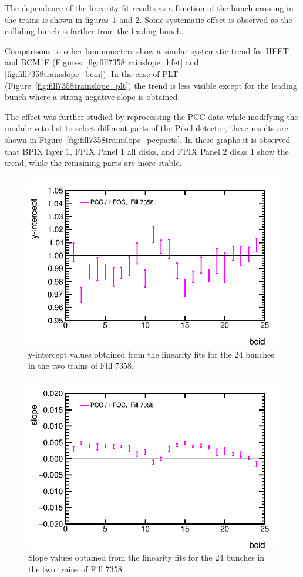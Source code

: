 The dependence of the linearity fit results as a function of  the bunch crossing in the trains is shown in figures~\ref{fig:fill7358trainintercept} and \ref{fig:fill7358trainslope}.
Some systematic effect is observed as the colliding bunch is farther from the leading bunch.

Comparisons to other luminometers show a similar systematic trend for HFET and BCM1F (Figures~\ref{fig:fill7358trainslope_hfet} and \ref{fig:fill7358trainslope_bcm}).
In the case of PLT (Figure~\ref{fig:fill7358trainslope_plt}) the trend is less visible except for the leading bunch where a strong negative slope is obtained.

The effect was further studied by reprocessing the PCC data while modifying the module veto list to select different parts of the Pixel detector, these results are shown in Figure~\ref{fig:fill7358trainslope_pccparts}.
In these graphs it is observed that BPIX layer 1, FPIX Panel 1 all disks, and FPIX Panel 2 disks 1 show the trend, while the remaining parts are more stable.

\clearpage
\begin{figure}[t]
  \begin{center}
    \includegraphics[width=0.47\linewidth]{plots/sbilratios_trains_Fill7358/plot_det_linearity_perbx_y0_7358.png}
    \caption{
      y-intercept values obtained from the linearity fits for the 24 bunches in the two trains of Fill 7358.
      \label{fig:fill7358trainintercept}
    }
  \end{center}
\end{figure}

\begin{figure}[t]
  \begin{center}
    \includegraphics[width=0.47\linewidth]{plots/sbilratios_trains_Fill7358/plot_det_linearity_perbx_slope_7358.png}
    \caption{
      Slope values obtained from the linearity fits for the 24 bunches in the two trains of Fill 7358.
      \label{fig:fill7358trainslope}
    }
  \end{center}
\end{figure}


